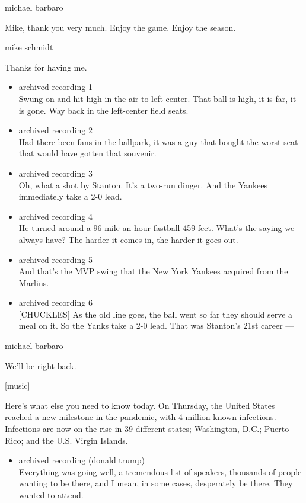 michael barbaro

Mike, thank you very much. Enjoy the game. Enjoy the season.

mike schmidt

Thanks for having me.

\begin{itemize}
\item
  archived recording 1\\
  Swung on and hit high in the air to left center. That ball is high, it
  is far, it is gone. Way back in the left-center field seats.
\item
  archived recording 2\\
  Had there been fans in the ballpark, it was a guy that bought the
  worst seat that would have gotten that souvenir.
\item
  archived recording 3\\
  Oh, what a shot by Stanton. It's a two-run dinger. And the Yankees
  immediately take a 2-0 lead.
\item
  archived recording 4\\
  He turned around a 96-mile-an-hour fastball 459 feet. What's the
  saying we always have? The harder it comes in, the harder it goes out.
\item
  archived recording 5\\
  And that's the MVP swing that the New York Yankees acquired from the
  Marlins.
\item
  archived recording 6\\
  {[}CHUCKLES{]} As the old line goes, the ball went so far they should
  serve a meal on it. So the Yanks take a 2-0 lead. That was Stanton's
  21st career ---
\end{itemize}

michael barbaro

We'll be right back.

{[}music{]}

Here's what else you need to know today. On Thursday, the United States
reached a new milestone in the pandemic, with 4 million known
infections. Infections are now on the rise in 39 different states;
Washington, D.C.; Puerto Rico; and the U.S. Virgin Islands.

\begin{itemize}
\tightlist
\item
  archived recording (donald trump)\\
  Everything was going well, a tremendous list of speakers, thousands of
  people wanting to be there, and I mean, in some cases, desperately be
  there. They wanted to attend.
\end{itemize}

